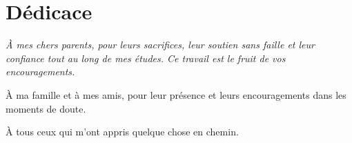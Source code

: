 \chapter*{Dédicace}
\thispagestyle{plain}
\vspace*{2cm}
\begin{flushright}
\begin{minipage}{0.75\textwidth}
\itshape
À mes chers parents, pour leurs sacrifices, leur soutien sans faille et leur confiance
tout au long de mes études. Ce travail est le fruit de vos encouragements.

\medskip
À ma famille et à mes amis, pour leur présence et leurs encouragements dans les moments
de doute.

\medskip
À tous ceux qui m'ont appris quelque chose en chemin.

\medskip
\hfill\upshape\textbf{\etudiant}
\end{minipage}
\end{flushright}

